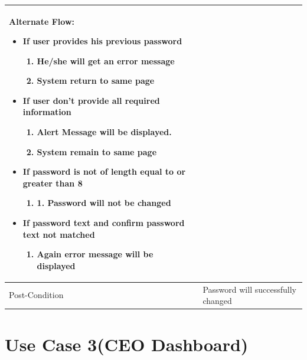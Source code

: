 \documentclass[12pt,a4paper]{report}
\begin{document}
\begin{tabular}{ | m{3cm} | m{12cm}| }
Alternate Flow:

\begin{itemize}
\item If user provides his previous password
	\begin{enumerate}
		\item	He/she will get an error message
		\item  System return to same page
	\end{enumerate}
\item If user don’t provide all required information
	\begin{enumerate}
	   	\item 	Alert Message will be displayed.
		\item 	System remain to same page
	\end{enumerate}
\item If password is not of length equal to or greater than 8
	\begin{enumerate}
		\item 	1.	Password will not be changed
	\end{enumerate}
\item If password text and confirm password text not matched
	\begin{enumerate}
		\item 	Again error message will be displayed
	\end{enumerate}
\end{itemize}
\\ \hline
Post-Condition &  Password will successfully changed  \\ \hline

\end{tabular}
\section{ Use Case 3(CEO Dashboard)}
\end{document}
